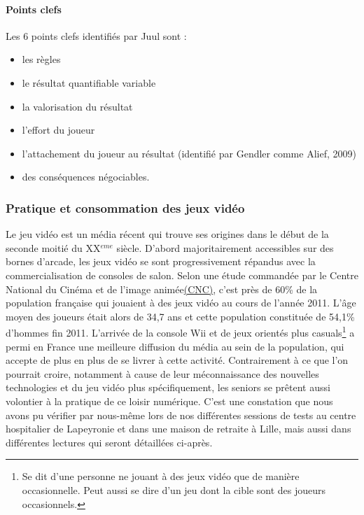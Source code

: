 \paragraph{Points clefs \\}
Les 6 points clefs identifiés par Juul sont :
\begin{itemize}
	\item les règles
	\item le résultat quantifiable variable
	\item la valorisation du résultat
	\item l’effort du joueur
	\item l’attachement du joueur au résultat (identifié par Gendler comme Alief, 2009)
	\item des conséquences négociables.
\end{itemize}

		\subsubsection*{Pratique et consommation des jeux vidéo}
Le jeu vidéo est un média récent qui trouve ses origines dans le début de la seconde moitié du XX$^{eme}$ siècle. D'abord majoritairement accessibles sur des bornes d'arcade, les jeux vidéo se sont progressivement répandus avec la commercialisation de consoles de salon. Selon une étude commandée par le Centre National du Cinéma et de l'image animée\href{http://www.cnc.fr}{(CNC)}, c'est près de 60\% de la population française qui jouaient à des jeux vidéo au cours de l'année 2011\cite{Cnc11}. L'âge moyen des joueurs était alors de 34,7 ans et cette population constituée de 54,1\% d'hommes fin 2011\cite{Cnc11}. L'arrivée de la console Wii et de jeux orientés plus casuals\footnote{Se dit d'une personne ne jouant à des jeux vidéo que de manière occasionnelle. Peut aussi se dire d'un jeu dont la cible sont des joueurs occasionnels.} a permi en France une meilleure diffusion du média au sein de la population, qui accepte de plus en plus de se livrer à cette activité. Contrairement à ce que l'on pourrait croire, notamment à cause de leur méconnaissance des nouvelles technologies et du jeu vidéo plus spécifiquement, les seniors se prêtent aussi volontier à la pratique de ce loisir numérique. C'est une constation que nous avons pu vérifier par nous-même lors de nos différentes sessions de tests au centre hospitalier de Lapeyronie et dans une maison de retraite à Lille, mais aussi dans différentes lectures qui seront détaillées ci-après.
	
